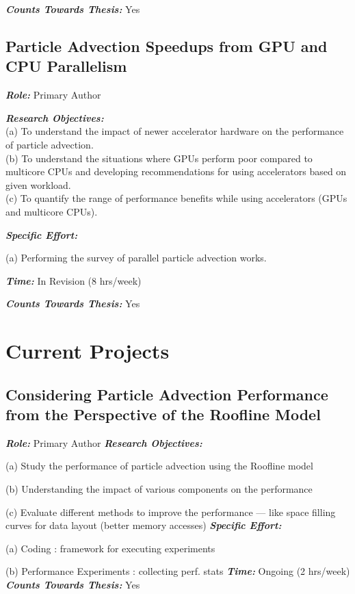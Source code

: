 \documentclass{article}
\newcommand{\boit}[1]{\textbf{\textit{#1}}}
\begin{document}
\noindent \boit{Counts Towards Thesis:} Yes

\subsection{Particle Advection Speedups from GPU and CPU Parallelism}

\noindent \boit{Role:} Primary Author

\noindent \boit{Research Objectives:}
\\
\noindent
(a) To understand the impact of newer accelerator hardware on the performance of particle advection.
\\
(b) To understand the situations where GPUs perform poor compared to multicore CPUs and developing recommendations
for using accelerators based on given workload.
\\
(c) To quantify the range of performance benefits while using accelerators (GPUs and multicore CPUs).

\noindent \boit{Specific Effort:}

\noindent (a) Performing the survey of parallel particle advection works.

\noindent \boit{Time:} In Revision (8 hrs/week)

\noindent \boit{Counts Towards Thesis:} Yes

\section{Current Projects}


\subsection{Considering Particle Advection Performance from the Perspective of the Roofline Model}
\noindent \boit{Role:} Primary Author
\noindent \boit{Research Objectives:}

(a) Study the performance of particle advection using the Roofline model

(b) Understanding the impact of various components on the performance

(c) Evaluate different methods to improve the performance ---
like space filling curves for data layout (better memory accesses)
\noindent \boit{Specific Effort:}

(a) Coding : framework for executing experiments

(b) Performance Experiments : collecting perf. stats
\noindent \boit{Time:}
Ongoing (2 hrs/week)
\noindent \boit{Counts Towards Thesis:} Yes
\end{document}
